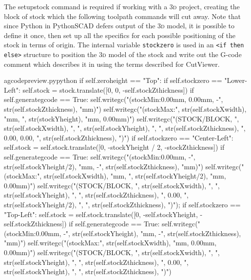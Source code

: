 \documentclass{ltxdoc}
\begin{document}
\noindent The \gls{setupstock} command is required if working with a \textsc{3d} project, creating the block of stock which the following toolpath commands will cut away. Note that since Python in PythonSCAD defers output of the \textsc{3d} model, it is possible to define it once, then set up all the specifics for each possible positioning of the stock in terms of origin. The internal variable \verb|stockzero| is used in an \verb|<if then else>| structure to position the \textsc{3d} model of the stock and write out the G-code comment which describes it in using the terms described for CutViewer. 

\lstset{firstnumber=\thegcpy}
\begin{writecode}{a}{gcodepreview.py}{python}
        if self.zeroheight == "Top":
            if self.stockzero == "Lower-Left":
                self.stock = stock.translate([0, 0, -self.stockZthickness])
                if self.generategcode == True:
                    self.writegc("(stockMin:0.00mm, 0.00mm, -", str(self.stockZthickness), "mm)")
                    self.writegc("(stockMax:", str(self.stockXwidth), "mm, ", str(stockYheight), "mm, 0.00mm)")
                    self.writegc("(STOCK/BLOCK, ", str(self.stockXwidth), ", ", str(self.stockYheight), ", ", str(self.stockZthickness), ", 0.00, 0.00, ", str(self.stockZthickness), ")")
            if self.stockzero == "Center-Left":
                self.stock = self.stock.translate([0, -stockYheight / 2, -stockZthickness])
                if self.generategcode == True:
                    self.writegc("(stockMin:0.00mm, -", str(self.stockYheight/2), "mm, -", str(self.stockZthickness), "mm)")
                    self.writegc("(stockMax:", str(self.stockXwidth), "mm, ", str(self.stockYheight/2), "mm, 0.00mm)")
                    self.writegc("(STOCK/BLOCK, ", str(self.stockXwidth), ", ", str(self.stockYheight), ", ", str(self.stockZthickness), ", 0.00, ", str(self.stockYheight/2), ", ", str(self.stockZthickness), ")");
            if self.stockzero == "Top-Left":
                self.stock = self.stock.translate([0, -self.stockYheight, -self.stockZthickness])
                if self.generategcode == True:
                    self.writegc("(stockMin:0.00mm, -", str(self.stockYheight), "mm, -", str(self.stockZthickness), "mm)")
                    self.writegc("(stockMax:", str(self.stockXwidth), "mm, 0.00mm, 0.00mm)")
                    self.writegc("(STOCK/BLOCK, ", str(self.stockXwidth), ", ", str(self.stockYheight), ", ", str(self.stockZthickness), ", 0.00, ", str(self.stockYheight), ", ", str(self.stockZthickness), ")")

\end{writecode}
\end{document}
